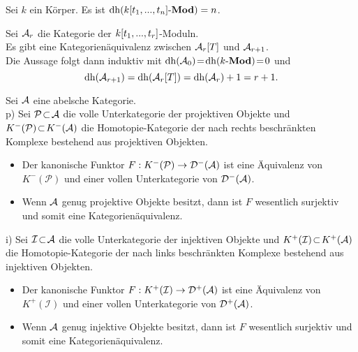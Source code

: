 \documentclass{cheat-sheet}
\DeclareMathOperator{\dimh}{dh} %
\newcommand{\Inj}{\mathcal{I}} %
\newcommand{\Proj}{\mathcal{P}} %
\begin{document}
\begin{thm}[Hilbert]
  Sei $k$ ein Körper. Es ist $\dimh(\text{$k[t_1, \nldots, t_n]$-$\Mod$}) = n$.
\end{thm}

\begin{beweisidee}
  Sei $\mathcal{A}_r$ die Kategorie der $k[t_1, ..., t_r]$-Moduln. \\
  Es gibt eine Kategorienäquivalenz zwischen $\mathcal{A}_r[T]$ und $\mathcal{A}_{r+1}$. \\
  Die Aussage folgt dann induktiv mit $\dimh(\Aat_0) \!=\! \dimh(\text{$k$-$\Mod$}) \!=\! 0$ und
  \[ \dimh(\Aat_{r+1}) = \dimh(\Aat_r[T]) = \dimh(\Aat_r) + 1 = r + 1. \]
\end{beweisidee}



\begin{thm}
  Sei $\mathcal{A}$ eine abelsche Kategorie. \\
  p) \enspace Sei $\Proj \!\subset\! \Aat$ die volle Unterkategorie der projektiven Objekte und $K^-(\Proj) \!\subset\! K^-(\Aat)$ die Homotopie-Kategorie der nach rechts beschränkten Komplexe bestehend aus projektiven Objekten.
  \begin{itemize}
    \item Der kanonische Funktor $F : K^-(\Proj) \to \Der^-(\Aat)$ ist eine Äquivalenz von $K^-(\Proj)$ und einer vollen Unterkategorie von $\mathcal{D}^-(\mathcal{A})$.
    \item Wenn $\mathcal{A}$ genug projektive Objekte besitzt, dann ist $F$ wesentlich surjektiv und somit eine Kategorienäquivalenz.
  \end{itemize}
  i) \enspace Sei $\Inj \!\subset\! \Aat$ die volle Unterkategorie der injektiven Objekte und $K^+(\Inj) \!\subset\! K^+(\Aat)$ die Homotopie-Kategorie der nach links beschränkten Komplexe bestehend aus injektiven Objekten.
  \begin{itemize}
    \item Der kanonische Funktor $F : K^+(\Inj) \to \Der^+(\Aat)$ ist eine Äquivalenz von $K^+(\Inj)$ und einer vollen Unterkategorie von $\mathcal{D}^+(\mathcal{A})$.
    \item Wenn $\mathcal{A}$ genug injektive Objekte besitzt, dann ist $F$ wesentlich surjektiv und somit eine Kategorienäquivalenz.
  \end{itemize}
\end{thm}
\end{document}
